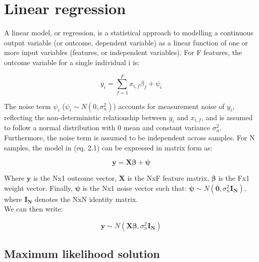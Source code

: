 
\section{Linear regression} 

A linear model, or regression, is a statistical approach to modelling a continuous output variable (or outcome, dependent variable) as a linear function of one or more input variables (features, or independent variables). For F features, the outcome variable for a single individual i is:

\begin{equation} \label{eq1:Linear_regression_sample_i}
 y_i = \sum_{f=1}^{F} x_{i,f}\beta_f + \psi_i
\end{equation}

The noise term $\psi_i$ ($ \psi_i \sim N(0, \sigma_n^2)$) accounts for measurement noise of $y_i$, reflecting the non-deterministic relationship between $y_i$ and $x_{i,f}$, and is assumed to follow a normal distribution with 0 mean and constant variance $\sigma_n^2$. Furthermore, the noise term is assumed to be independent across samples. For N samples, the model in (eq. 2.1) can be expressed in matrix form as:

\begin{equation} \label{eq2:Linear_regression_matrix_form}
\mathbf{y} = \mathbf{X}\boldsymbol{\beta} + \boldsymbol{\psi} 
\end{equation}

Where $\mathbf{y}$ is the Nx1 outcome vector, $\mathbf{X}$ is the NxF feature matrix, $\boldsymbol{\beta}$ is the Fx1 weight vector. 
Finally, $\boldsymbol{\psi}$ is the Nx1 noise vector such that: $\boldsymbol{\psi}\sim N(\mathbf{0}, \sigma_n^2 \mathbf{I_N})$, where $\mathbf{I_N}$ denotes the NxN identity matrix. \\ 

We can then write:

\begin{equation} \label{eq3:Linear_regression_MVN_form}
\mathbf{y} \sim N(\mathbf{X}\boldsymbol{\beta}, \sigma_n^2 \mathbf{I_N}) 
\end{equation}

\newpage

\subsection{Maximum likelihood solution}

